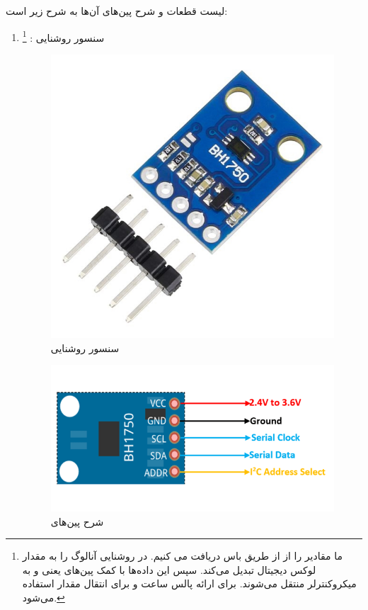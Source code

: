 \documentclass[12pt,a4paper]{article}
\begin{document}
	لیست قطعات و شرح پین‌های آن‌ها به شرح زیر است:
	\begin{enumerate}
		\item {
			سنسور روشنایی : 
			\footnote{	ما مقادیر  را از  از طریق باس  دریافت می کنیم.  در  روشنایی آنالوگ را به مقدار لوکس دیجیتال تبدیل می‌کند. سپس این داده‌ها با کمک پین‌های  یعنی  و  به میکروکنترلر منتقل می‌شوند.  برای ارائه پالس ساعت و  برای انتقال مقدار  استفاده می‌شود.}}
		
		\begin{figure}[H]
			\centering
			\includegraphics[scale=0.2]{figs/BH1750FVI.jpeg}
			\caption{
				سنسور روشنایی 
			}
			\label{fig:schema1}
		\end{figure}
		
		\begin{figure}[H]
			\centering
			\includegraphics[scale=0.3]{figs/BH1750-Light-Sensor-Pinout.png}
			\caption{
				شرح پین‌های 
			}
			\label{fig:schema2}
		\end{figure}
		

\end{enumerate}
\end{document}
